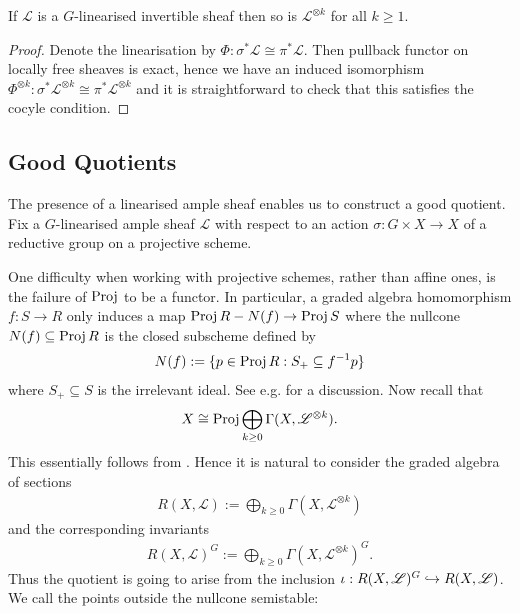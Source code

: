 \documentclass[12pt]{ociamthesis}  %
\begin{document}
\begin{lemma}
  If $\mathscr L$ is a $G$-linearised invertible sheaf then so is
  $\mathscr L^{\otimes k}$ for all $k\geq 1$.
  \begin{proof}
    Denote the linearisation by $\Phi : \sigma^*\mathscr L \cong \pi^*\mathscr
      L$.  Then pullback functor on locally free sheaves is exact, hence we have
    an induced isomorphism $\Phi^{\otimes k} : \sigma^*\mathscr L^{\otimes k}
      \cong \pi^*\mathscr L^{\otimes k}$ and it is straightforward to check that
    this satisfies the cocyle condition.
  \end{proof}
\end{lemma}

\subsection{Good Quotients}

The presence of a linearised ample sheaf enables us to construct a good
quotient.  Fix a $G$-linearised ample sheaf $\mathscr L$ with respect to an
action $\sigma : G\times X\to X$ of a reductive group on a projective scheme.

One difficulty when working with projective schemes, rather
than affine ones, is the failure of $\operatorname{Proj}$ to be a functor. In particular,
a graded algebra homomorphism $f : S \to R$ only induces a map
$\operatorname{Proj} R - N(f) \to \operatorname{Proj} S$ where the nullcone $N(f)\subseteq\operatorname{Proj} R$ is the closed
subscheme defined by
\begin{align*}
  N(f) := \{ p \in \operatorname{Proj} R : S_+ \subseteq f^{-1}p\}
\end{align*}
where $S_+\subseteq S$ is the irrelevant ideal. See e.g.
\cite[Remark 13.7]{gortz2010} for a discussion. Now recall that
\begin{align*}
  X \cong \operatorname{Proj}\bigoplus_{k\geq 0}\Gamma(X,\mathscr L^{\otimes k}).
\end{align*}
This essentially follows from \cite[Proposition 13.48]{gortz2010}. Hence
it is natural to consider the graded algebra of sections
\begin{align*}
  R(X,\mathscr L) := \bigoplus_{k\geq 0}\Gamma(X,\mathscr L^{\otimes k})
\end{align*}
and the corresponding invariants
\begin{align*}
  R(X,\mathscr L)^G := \bigoplus_{k\geq 0}\Gamma(X,\mathscr L^{\otimes k})^G.
\end{align*}
Thus the quotient is going to arise from the inclusion
$\iota : R(X,\mathscr L)^G\hookrightarrow R(X,\mathscr L)$. We call the points outside the nullcone
semistable:
\end{document}
